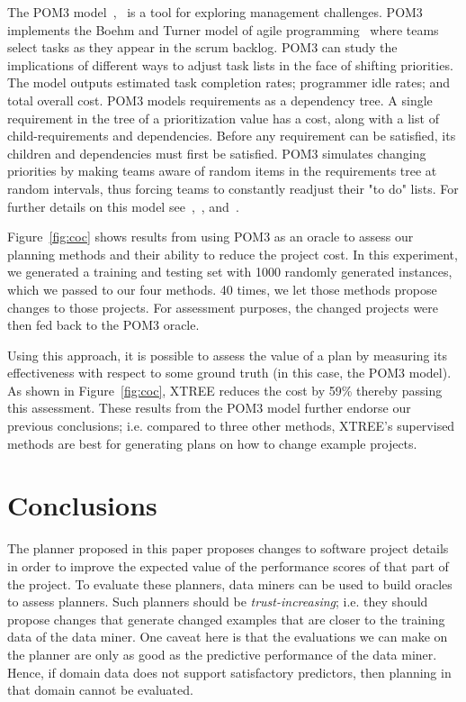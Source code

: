 \documentclass{sig-alternate}
\newcommand{\fig}[1]{Figure~\ref{fig:#1}}
\begin{document}
\begin{itemize}
The POM3 model~\cite{boehm2003using},~\cite{port2008} is a tool for exploring management challenges. POM3 implements the Boehm and Turner model of agile programming~\cite{boehm2003balancing} where teams select tasks as they appear in the scrum backlog.  POM3 can study the implications of different ways to adjust task lists in the face of shifting priorities. The model outputs estimated task completion rates; programmer idle rates; and total overall cost. POM3 models requirements as a dependency tree. A single requirement in the tree of a prioritization value has a cost, along with a list of child-requirements and dependencies. Before any requirement can be satisfied, its children and dependencies must first be satisfied. POM3 simulates changing priorities by making teams aware of random items in the requirements tree at random intervals, thus forcing teams to constantly readjust their "to do" lists. For further details on this model see~\cite{boehm2003using},~\cite{port2008}, and~\cite{boehm2003balancing}. 

\fig{coc} shows results from using POM3 as an oracle to assess our planning methods and their ability to reduce the project cost. In this experiment, we generated a training and testing set with 1000 randomly generated instances, which we passed to our four methods.
40 times, we let those methods propose changes to those projects. 
For assessment purposes, the changed projects were then fed back to the POM3
oracle. 

Using this approach, it is possible to assess the value of a plan by measuring its
effectiveness with respect to some ground truth (in this case, the POM3 model).
As shown in \fig{coc}, XTREE reduces the cost by 59\% thereby passing this assessment. These results from the POM3 model further endorse our previous conclusions; i.e. compared to three other methods,  XTREE's supervised methods are best for generating plans on how to change example projects.
 
 
\section{Conclusions}

The planner proposed in this paper proposes changes to software project details in order to improve the expected
value of the performance scores of that part of the project.
To evaluate these planners,
data miners can be used to build oracles to assess planners.
Such planners should be {\em trust-increasing}; i.e. they should propose changes that generate
changed examples that are closer to the training data of the data miner.
One caveat here is that the evaluations we can make on the planner are only as good as the predictive
performance of the data miner. Hence, if domain data does not support satisfactory predictors, then
planning in that domain cannot be evaluated.


\end{itemize}
\end{document}
